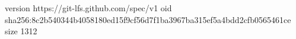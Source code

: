 version https://git-lfs.github.com/spec/v1
oid sha256:8c2b540344b4058180ed15f9cf56d7f1ba3967ba315ef5a4bdd2cfb0565461ce
size 1312
